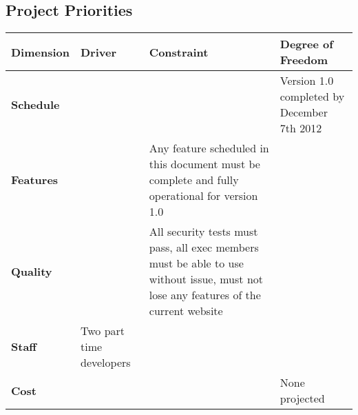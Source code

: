 \documentclass[11pt,letterpaper,rotate]{article}
\begin{document}
\newpage
\subsection{Project Priorities}

\FloatBarrier

\begin{flushleft}
\begin{longtable}{@{}|p{2.7cm}|p{3.7cm}|p{3.7cm}|p{3.7cm}|}
        \hline
        {\bf Dimension} & {\bf Driver}                   & {\bf
          Constraint}
        & {\bf Degree of Freedom}                    \\ \hline
        {\bf Schedule}  & ~                        & ~
        & Version 1.0 completed by December 7th 2012 \\ \hline
        {\bf Features}  & ~                        & Any feature scheduled in this document must be complete and fully operational for version 1.0 & ~                                    \\ \hline
        {\bf Quality}   & ~                        & All security
        tests must pass, all exec members must be able to use without
        issue, must not lose any features of the current website      & ~                                    \\ \hline
        {\bf Staff}     & Two part time developers & ~                                                                                     & ~                                    \\ \hline
        {\bf Cost}      & ~                        & ~                                                                                     & None projected                       \\
        \hline
\end{longtable}
\end{flushleft}
\FloatBarrier
\end{document}
